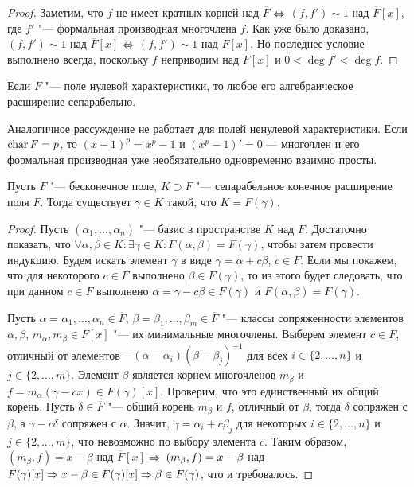\begin{proof}
	Заметим, что $f$ не имеет кратных корней над $\overline{F}$ $\Leftrightarrow$ $(f, f') \sim 1$ над $\overline{F}[x]$, где $f'$ "--- формальная производная многочлена $f$. Как уже было доказано, $(f, f') \sim 1$ над $\overline{F}[x]$ $\Leftrightarrow$ $(f, f') \sim 1$ над $F[x]$. Но последнее условие выполнено всегда, поскольку $f$ неприводим над $F[x]$ и $0 < \deg{f'} < \deg{f}$.
\end{proof}

\begin{corollary}
	 Если $F$ "--- поле нулевой характеристики, то любое его алгебраическое расширение сепарабельно.
\end{corollary}

\begin{note}
	Аналогичное рассуждение не работает для полей ненулевой характеристики. Если $\operatorname{char}{F} = p$, то $(x - 1)^p = x^p - 1$ и $(x^p - 1)' = 0$ --- многочлен и его формальная производная уже необязательно одновременно взаимно просты.
\end{note}

\begin{theorem}
	Пусть $F$ "--- бесконечное поле, $K \supset F$ "--- сепарабельное конечное расширение поля $F$. Тогда существует $\gamma \in K$ такой, что $K = F(\gamma)$.
\end{theorem}

\begin{proof}
	Пусть $(\alpha_1, \dotsc, \alpha_n)$ "--- базис в пространстве $K$ над $F$. Достаточно показать, что $\forall \alpha, \beta \in K: \exists \gamma \in K: F(\alpha, \beta) = F(\gamma)$, чтобы затем провести индукцию. Будем искать элемент $\gamma$ в виде $\gamma = \alpha +c\beta$, $c \in F$. Если мы покажем, что для некоторого $c \in F$ выполнено $\beta \in F(\gamma)$, то из этого будет следовать, что при данном $c \in F$ выполнено $\alpha = \gamma - c\beta \in F(\gamma)$ и $F(\alpha, \beta) = F(\gamma)$.
	
	Пусть $\alpha = \alpha_1, \dotsc, \alpha_n \in \overline{F}$, $\beta = \beta_1, \dotsc, \beta_m \in \overline{F}$ "--- классы сопряженности элементов $\alpha, \beta$, $m_\alpha, m_\beta \in F[x]$ "--- их минимальные многочлены. Выберем элемент $c \in F$, отличный от элементов $-(\alpha - \alpha_i)(\beta - \beta_j)^{-1}$ для всех $i \in \{2, \dotsc, n\}$ и $j \in \{2, \dotsc, m\}$. Элемент $\beta$ является корнем многочленов $m_\beta$ и $f = m_\alpha(\gamma - cx) \in F(\gamma)[x]$. Проверим, что это единственный их общий корень. Пусть $\delta \in \overline{F}$ "--- общий корень $m_\beta$ и $f$, отличный от $\beta$, тогда $\delta$ сопряжен с $\beta$, а $\gamma - c\delta$ сопряжен с $\alpha$. Значит, $\gamma = \alpha_i + c\beta_j$ для некоторых $i \in \{2, \dotsc, n\}$ и $j \in \{2, \dotsc, m\}$, что невозможно по выбору элемента $c$. Таким образом, $(m_\beta, f) = x - \beta$ над $\overline{F}[x]$ $\Rightarrow$ $(m_\beta, f) \hm= x - \beta$ над $F(\gamma)[x] \Rightarrow x - \beta \in F(\gamma)[x] \Rightarrow \beta \in F(\gamma)$, что и требовалось.
\end{proof}

